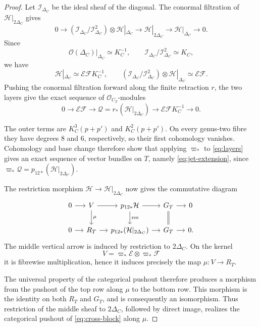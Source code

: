 \documentclass[11pt,a4paper,dvipsnames]{amsart}
\numberwithin{equation}{section}
\theoremstyle{plain}
\theoremstyle{definition}
\newcommand{\cO}{\mathcal O}
\newcommand{\cE}{\mathcal E}
\newcommand{\cF}{\mathcal F}
\newcommand{\cH}{\mathcal H}
\begin{document}
\begin{proof}
Let $\mathcal I_{\Delta_C}$ be the ideal sheaf of the diagonal.  The
conormal filtration of $\cH|_{2\Delta_C}$ gives
$$
0\longrightarrow
 \left(\mathcal I_{\Delta_C}/\mathcal I_{\Delta_C}^2\right)
 \otimes\cH|_{\Delta_C}
\longrightarrow
 \cH|_{2\Delta_C}
\longrightarrow
 \cH|_{\Delta_C}
\longrightarrow0.
$$
Since
$$
 \cO(\Delta_C)|_{\Delta_C}\simeq K_C^{-1},
 \qquad
 \mathcal I_{\Delta_C}/\mathcal I_{\Delta_C}^2\simeq K_C,
$$
we have
$$
 \cH|_{\Delta_C}\simeq\cE\cF K_C^{-1},
 \qquad
 \left(\mathcal I_{\Delta_C}/\mathcal I_{\Delta_C}^2\right)
 \otimes\cH|_{\Delta_C}\simeq\cE\cF.
$$
Pushing the conormal filtration forward along the finite retraction
$r$, the two layers give the exact sequence of $\cO_{C_T}$-modules
\begin{equation}\label{eq:layers}
0\longrightarrow\cE\cF
\longrightarrow\mathscr Q=r_*(\cH|_{2\Delta_C})
\longrightarrow\cE\cF K_C^{-1}
\longrightarrow0.
\end{equation}

The outer terms are $K_C^3(p+p')$ and $K_C^2(p+p')$.  On every genus-two
fibre they have degrees $8$ and $6$, respectively, so their first
cohomology vanishes.  Cohomology and base change therefore show that
applying $\varpi_*$ to \eqref{eq:layers} gives an exact sequence of vector
bundles on $T$, namely \eqref{eq:jet-extension}, since
$\varpi_*\mathscr Q=p_{12*}(\cH|_{2\Delta_C})$.

The restriction morphism $\cH\to\cH|_{2\Delta_C}$ now gives the
commutative diagram
$$
\begin{tikzcd}[column sep=small]
0 \arrow[r] & V \arrow[r] \arrow[d,"\mu"]
  & p_{12*}\cH \arrow[r] \arrow[d,"\mathrm{res}"]
  & G_T \arrow[r] \arrow[d,equal] & 0\\
0 \arrow[r] & R_T \arrow[r]
  & p_{12*}(\cH|_{2\Delta_C}) \arrow[r]
  & G_T \arrow[r] & 0.
\end{tikzcd}
$$
The middle vertical arrow is induced by restriction to $2\Delta_C$.
On the kernel
$$
 V=\varpi_*\cE\otimes\varpi_*\cF
$$
it is fibrewise multiplication, hence it induces precisely the map
$\mu:V\to R_T$.

The universal property of the categorical pushout therefore produces a
morphism from the pushout of the top row along $\mu$ to the bottom row.
This morphism is the identity on both $R_T$ and $G_T$, and is consequently
an isomorphism.  Thus restriction of the middle sheaf to $2\Delta_C$,
followed by direct image, realizes the categorical pushout of
\eqref{eq:cross-block} along $\mu$.



\end{proof}
\end{document}
